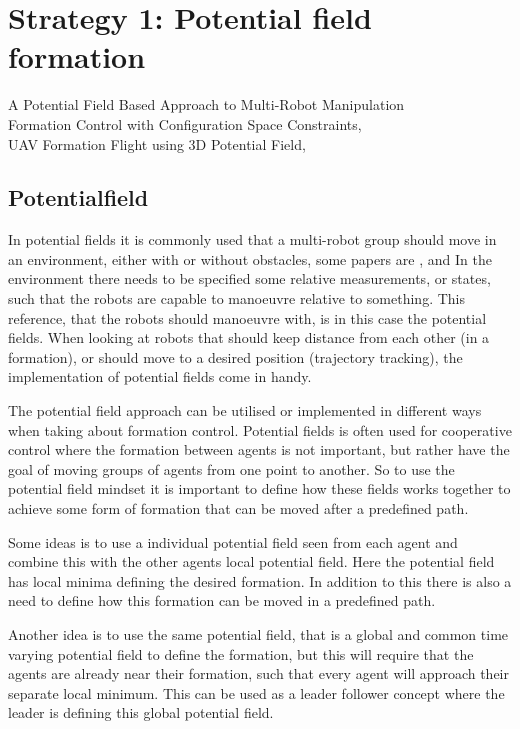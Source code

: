 \section{Strategy 1: Potential field formation}
\label{sc:potential-fields}
A Potential Field Based Approach to Multi-Robot Manipulation \citep{pfmrm}\\
Formation Control with Configuration Space Constraints, \citep{fccsc}\\
UAV Formation Flight using 3D Potential Field, \citep{UAVff3dpf}\\


\subsection{Potentialfield}
In potential fields it is commonly used that a multi-robot group should move in an environment, either with or without obstacles, some papers are \citep{pfmrm}, \citep{fccsc} and \citep{UAVff3dpf} In the environment there needs to be specified some relative measurements, or states, such that the robots are capable to manoeuvre relative to something. This reference, that the robots should manoeuvre with, is in this case the potential fields. When looking at robots that should keep distance from each other (in a formation), or should move to a desired position (trajectory tracking), the implementation of potential fields come in handy.

The potential field approach can be utilised or implemented in
different ways when taking about formation control. Potential fields
is often used for cooperative control where the formation between
agents is not important, but rather have the goal of moving groups of
agents from one point to another.  So to
use the potential field mindset it is important to define how these
fields works together to achieve some form of formation that can be
moved after a predefined path. 

Some ideas is to use a individual potential field seen from each
agent and combine this with the other agents local potential field.
Here the potential field has local minima defining the desired
formation. In addition to this there is also a need to define how this
formation can be moved in a predefined path.

Another idea is to use the same potential field, that is a global and
common time varying potential field to define the formation, but this
will require that the agents are already near their formation, such
that every agent will approach their separate local minimum. This can
be used as a leader follower concept where the leader is defining this
global potential field.

